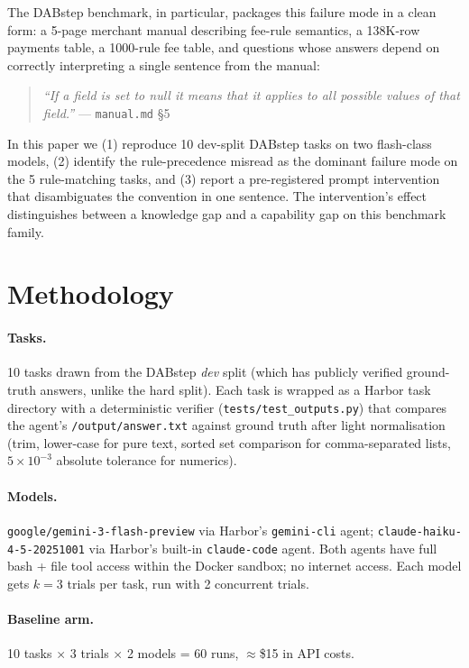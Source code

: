 \documentclass[11pt]{article}
\begin{document}
The DABstep benchmark, in particular, packages this failure mode in a clean form: a 5-page
merchant manual describing fee-rule semantics, a 138K-row payments table, a 1000-rule fee
table, and questions whose answers depend on correctly interpreting a single sentence from
the manual:

\begin{quote}
\emph{``If a field is set to null it means that it applies to all possible values of that
field.''} --- \texttt{manual.md} \S5
\end{quote}

In this paper we (1) reproduce 10 dev-split DABstep tasks on two flash-class models,
(2) identify the rule-precedence misread as the dominant failure mode on the 5 rule-matching
tasks, and (3) report a pre-registered prompt intervention that disambiguates the convention
in one sentence. The intervention's effect distinguishes between a knowledge gap and a
capability gap on this benchmark family.

\section{Methodology}

\paragraph{Tasks.} 10 tasks drawn from the DABstep \emph{dev} split (which has publicly
verified ground-truth answers, unlike the hard split). Each task is wrapped as a Harbor task
directory with a deterministic verifier (\texttt{tests/test\_outputs.py}) that compares the
agent's \texttt{/output/answer.txt} against ground truth after light normalisation
(trim, lower-case for pure text, sorted set comparison for comma-separated lists,
$5 \times 10^{-3}$ absolute tolerance for numerics).

\paragraph{Models.} \texttt{google/gemini-3-flash-preview} via Harbor's \texttt{gemini-cli}
agent; \texttt{claude-haiku-4-5-20251001} via Harbor's built-in \texttt{claude-code} agent.
Both agents have full bash + file tool access within the Docker sandbox; no internet access.
Each model gets $k=3$ trials per task, run with 2 concurrent trials.

\paragraph{Baseline arm.} 10 tasks $\times$ 3 trials $\times$ 2 models = 60 runs, $\approx$\$15 in API costs.
\end{document}
